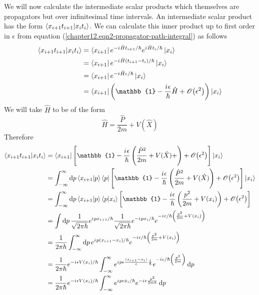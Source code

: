\begin{enumerate}
	We will now calculate the intermediate scalar products which themselves are propagators but over infinitesimal time intervals. An intermediate scalar product has the form $\braket{x_{i+1} t_{i+1}}{x_i t_i}$. We can calculate this inner product up to first order in $\epsilon$ from equation (\ref{chapter12.eqn2-propagator-path-integral}) as follows
	\begin{align}
		\braket{x_{i+1} t_{i+1}}{x_i t_i} &= \bra{x_{i+1}} e^{-\iu \hat{H}t_{i+1}/\hbar}e^{\iu \hat{H}t_{i}/\hbar}\ket{x_i}\\
		&= \bra{x_{i+1}} e^{-\iu \hat{H}(t_{i+1} - t_i)/\hbar}\ket{x_i}\\
		&= \bra{x_{i+1}} e^{-\iu \hat{H}\epsilon/\hbar}\ket{x_i}\\
		&= \bra{x_{i+1}} \left(\mathbb{1} - \frac{\iu \epsilon}{\hbar}\hat{H} + \order{\epsilon^2}\right)\ket{x_i}
	\end{align}
	We will take $\hat{H}$ to be of the form
	\begin{equation}
		\hat{H} = \frac{\hat{P}}{2 m} + V(\hat{X})
	\end{equation}
	Therefore
	\begin{align}
		\braket{x_{i+1} t_{i+1}}{x_i t_i} 
		&= \bra{x_{i+1}}\left[\mathbb{1} - \frac{\iu \epsilon}{\hbar}\left(\frac{\hat{P}^2}{2 m} + V(\hat{X}) + \right) + \order{\epsilon^2}\right]\ket{x_i}\\
		&= \int_{-\infty}^{\infty} \dd{p} \braket{x_{i+1}}{p} \bra{p} \left[\mathbb{1} - \frac{\iu \epsilon}{\hbar}\left(\frac{\hat{P}^2}{2 m} + V(\hat{X})\right) + \order{\epsilon^2}\right] \ket{x_i} \\
		&= \int_{-\infty}^{\infty} \dd{p} \braket{x_{i+1}}{p} \braket{p}{x_i} \left[\mathbb{1} - \frac{\iu \epsilon}{\hbar}\left(\frac{p^2}{2 m} + V(x_i)\right) + \order{\epsilon^2}\right]  \\
		&= \int \dd{p} \frac{1}{\sqrt{2\pi \hbar}}e^{\iu p x_{i+1}/\hbar}\frac{1}{\sqrt{2\pi \hbar}}e^{-\iu p x_{i}/\hbar} e^{-\iu \epsilon/\hbar \left( \frac{p^2}{2 m} + V(x_i) \right)} \\
		&= \frac{1}{2\pi\hbar} \int_{-\infty}^{\infty} \dd{p} e^{\iu p (x_{i+1} - x_i)/\hbar} e^{-\iu \epsilon/\hbar \left( \frac{p^2}{2 m} + V(x_i) \right)} \\
		&= \frac{1}{2\pi\hbar} e^{-\iu \epsilon V(x_i)/\hbar} \int_{-\infty}^{\infty} e^{\iu p \epsilon\frac{(x_{i+1} - x_i)}{\epsilon}\frac{1}{\hbar}} e^{-\iu \epsilon/\hbar \left( \frac{p^2}{2 m}\right)} \dd{p}\\
		&= \frac{1}{2\pi\hbar} e^{-\iu \epsilon V(x_i)/\hbar} \int_{-\infty}^{\infty} e^{\iu p \epsilon \dot{x}_i / \hbar} e^{-\iu \epsilon \frac{p^2}{2 m \hbar}} \dd{p} \\

\end{align}
\end{enumerate}
